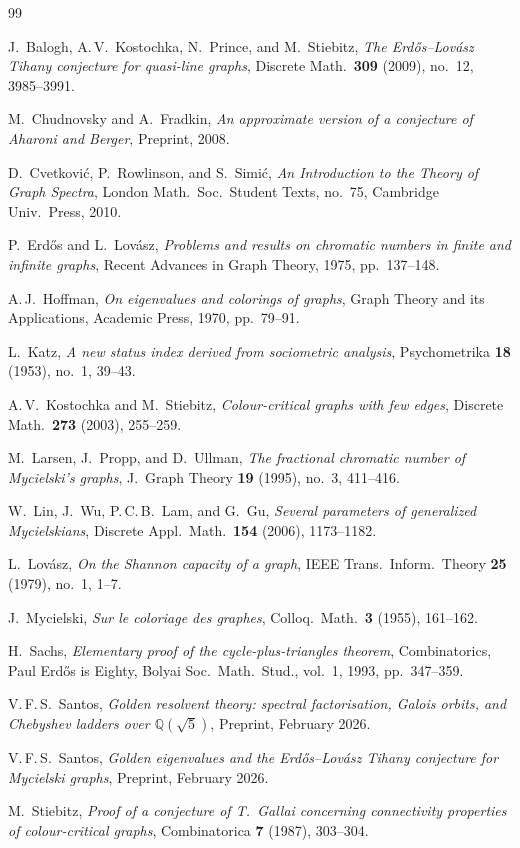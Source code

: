 \documentclass[11pt]{amsart}
\theoremstyle{definition}
\theoremstyle{remark}
\newcommand{\Q}{\mathbb{Q}}
\begin{document}
\begin{thebibliography}{99}

J.~Balogh, A.\,V.~Kostochka, N.~Prince, and M.~Stiebitz,
\emph{The Erd\H{o}s--Lov\'asz Tihany conjecture for quasi-line graphs},
Discrete Math.\ \textbf{309} (2009), no.~12, 3985--3991.

M.~Chudnovsky and A.~Fradkin,
\emph{An approximate version of a conjecture of Aharoni and Berger},
Preprint, 2008.

D.~Cvetkovi\'c, P.~Rowlinson, and S.~Simi\'c,
\emph{An Introduction to the Theory of Graph Spectra},
London Math.\ Soc.\ Student Texts, no.~75,
Cambridge Univ.\ Press, 2010.

P.~Erd\H{o}s and L.~Lov\'asz,
\emph{Problems and results on chromatic numbers in finite and 
infinite graphs},
Recent Advances in Graph Theory, 1975, pp.~137--148.

A.\,J.~Hoffman,
\emph{On eigenvalues and colorings of graphs},
Graph Theory and its Applications, Academic Press, 1970, pp.~79--91.

L.~Katz,
\emph{A new status index derived from sociometric analysis},
Psychometrika \textbf{18} (1953), no.~1, 39--43.

A.\,V.~Kostochka and M.~Stiebitz,
\emph{Colour-critical graphs with few edges},
Discrete Math.\ \textbf{273} (2003), 255--259.

M.~Larsen, J.~Propp, and D.~Ullman,
\emph{The fractional chromatic number of Mycielski's graphs},
J.~Graph Theory \textbf{19} (1995), no.~3, 411--416.

W.~Lin, J.~Wu, P.\,C.\,B.~Lam, and G.~Gu,
\emph{Several parameters of generalized Mycielskians},
Discrete Appl.\ Math.\ \textbf{154} (2006), 1173--1182.

L.~Lov\'asz,
\emph{On the Shannon capacity of a graph},
IEEE Trans.\ Inform.\ Theory \textbf{25} (1979), no.~1, 1--7.

J.~Mycielski,
\emph{Sur le coloriage des graphes},
Colloq.\ Math.\ \textbf{3} (1955), 161--162.

H.~Sachs,
\emph{Elementary proof of the cycle-plus-triangles theorem},
Combinatorics, Paul Erd\H{o}s is Eighty, Bolyai Soc.\ Math.\ 
Stud., vol.~1, 1993, pp.~347--359.

V.\,F.\,S.~Santos,
\emph{Golden resolvent theory: spectral factorisation, Galois orbits, 
and Chebyshev ladders over $\Q(\sqrt{5})$},
Preprint, February 2026.

V.\,F.\,S.~Santos,
\emph{Golden eigenvalues and the Erd\H{o}s--Lov\'asz Tihany 
conjecture for Mycielski graphs},
Preprint, February 2026.

M.~Stiebitz,
\emph{Proof of a conjecture of T.~Gallai concerning connectivity 
properties of colour-critical graphs},
Combinatorica \textbf{7} (1987), 303--304.

\end{thebibliography}
\end{document}
